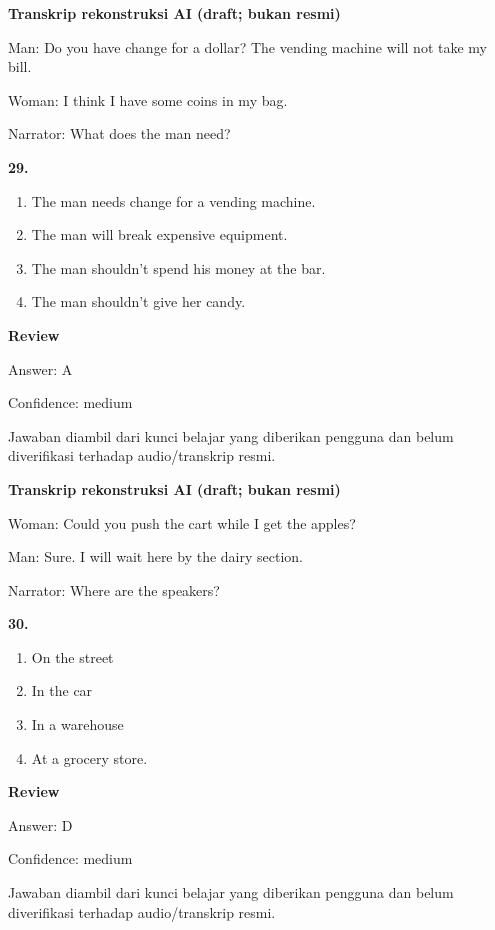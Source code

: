 \documentclass[12pt]{article}
\begin{document}
\endgroup
\par
\vspace{0.25\baselineskip}
\begin{exampleblock}
\textbf{Transkrip rekonstruksi AI (draft; bukan resmi)}\par
Man: Do you have change for a dollar? The vending machine will not take my bill.\par
Woman: I think I have some coins in my bag.\par
Narrator: What does the man need?\par
\end{exampleblock}
\noindent\textbf{29.}
\begin{enumerate}[label=(\Alph*),leftmargin=*,itemsep=0.2em]
\item The man needs change for a vending machine.
\item The man will break expensive equipment.
\item The man shouldn't spend his money at the bar.
\item The man shouldn't give her candy.
\end{enumerate}
\par
\begingroup
\setlength{\parskip}{0pt}
\setlength{\parindent}{0pt}
\textbf{Review}\par
Answer: A\par
Confidence: medium\par
Jawaban diambil dari kunci belajar yang diberikan pengguna dan belum diverifikasi terhadap audio/transkrip resmi.\par
\endgroup
\par
\vspace{0.25\baselineskip}
\begin{exampleblock}
\textbf{Transkrip rekonstruksi AI (draft; bukan resmi)}\par
Woman: Could you push the cart while I get the apples?\par
Man: Sure. I will wait here by the dairy section.\par
Narrator: Where are the speakers?\par
\end{exampleblock}
\noindent\textbf{30.}
\begin{enumerate}[label=(\Alph*),leftmargin=*,itemsep=0.2em]
\item On the street
\item In the car
\item In a warehouse
\item At a grocery store.
\end{enumerate}
\par
\begingroup
\setlength{\parskip}{0pt}
\setlength{\parindent}{0pt}
\textbf{Review}\par
Answer: D\par
Confidence: medium\par
Jawaban diambil dari kunci belajar yang diberikan pengguna dan belum diverifikasi terhadap audio/transkrip resmi.\par
\endgroup
\par
\vspace{0.25\baselineskip}
\end{document}
